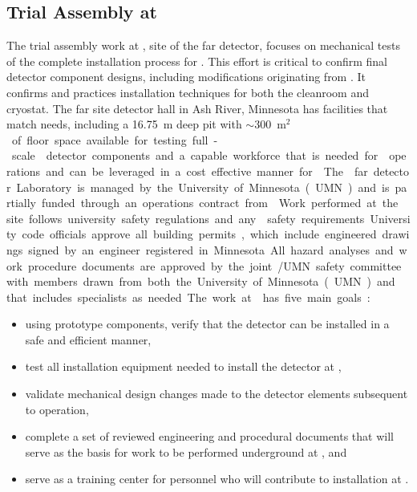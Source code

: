 \subsection{Trial Assembly at }

The trial assembly work at , site of the 
far detector, focuses on mechanical tests of the complete installation
process for . This effort is critical to confirm final
detector component designs, including modifications originating from
. It confirms and practices installation techniques
for both the cleanroom and cryostat.  The  far site
detector hall in Ash River, Minnesota has facilities that
match  needs, including a \SI{16.75}{m} deep pit with
$\sim$\SI{300}{m$^2$} of floor space available for testing full-scale
 detector components and a capable workforce that is
needed for  operations and can be leveraged in a cost effective
manner for .  The  far detector Laboratory is
managed by the University of Minnesota (UMN) and is partially funded
through an operations contract from .  Work performed at
the  site follows university safety regulations and
any  safety requirements University code officials approve
all building permits, which include engineered drawings signed by an
engineer registered in Minnesota. All hazard analyses and work
procedure documents are approved by the joint /UMN safety
committee with members drawn from both the University of Minnesota
(UMN) and  that includes specialists as needed.

The work at  has five main goals:
\begin{itemize}
  \item using prototype  components, verify that the  detector can be installed 
    in a safe and efficient manner,
    \item test all installation equipment needed to install the  detector at ,
  \item validate mechanical design changes made to the detector
    elements subsequent to  operation,
  \item complete a set of reviewed engineering and procedural documents that will serve 
    as the basis for work to be performed underground at 
    , and 
  \item serve as a training center for personnel who will 
    contribute to   installation at .
\end{itemize}


